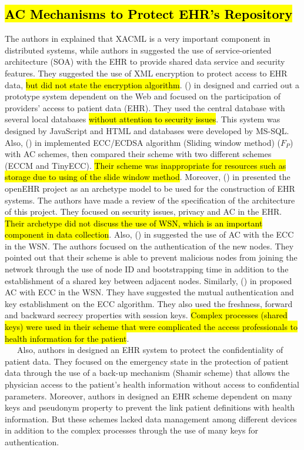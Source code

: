 \documentclass[a4paper,11pt]{article}
\DeclareRobustCommand{\hlyellow}[1]{{\sethlcolor{white}\hl{#1}}}
\begin{document}
\subsection{\hlyellow{AC Mechanisms to Protect EHR's Repository}}
The authors in \cite{pr42} explained that XACML is a very important component in distributed systems, while authors in \cite{pr52} suggested the use of service-oriented architecture (SOA) with the EHR to provide shared data service and security features. They suggested the use of XML encryption to protect access to EHR data, \hlyellow{but did not state the encryption algorithm}. \citeauthor{pr56}(\citeyear{pr56}) in \cite{pr56} designed and carried out a prototype system dependent on the Web and focused on the participation of providers' access to patient data (EHR). They used the central database with several local databases \hlyellow{without attention to security issues}. This system was designed by JavaScript and HTML and databases were developed by MS-SQL. Also, \citeauthor{p19}(\citeyear{p19}) in \cite{p19} implemented ECC/ECDSA algorithm (Sliding window method) ($F_P$) with AC schemes, then compared their scheme with two different schemes (ECCM and TinyECC). \hlyellow{Their scheme was inappropriate for resources such as storage due to using of the slide window method}. Moreover, \citeauthor{pr47}(\citeyear{pr47}) in \cite{pr47} presented the openEHR project as an archetype model to be used for the construction of EHR systems. The authors have made a review of the specification of the architecture of this project. They focused on security issues, privacy and AC in the EHR. \hlyellow{Their archetype did not discuss the use of WSN, which is an important component in data collection}. Also, \citeauthor{pr25}(\citeyear{pr25}) in \cite{pr25} suggested the use of AC with the ECC in the WSN. The authors focused on the authentication of the new nodes. They pointed out that their scheme is able to prevent malicious nodes from joining the network through the use of node ID and bootstrapping time in addition to the establishment of a shared key between adjacent nodes. Similarly, \citeauthor{pr24}(\citeyear{pr24}) in \cite{pr24} proposed AC with ECC in the WSN. They have suggested the mutual authentication and key establishment on the ECC algorithm. They also used the freshness, forward and backward secrecy properties with session keys. \hlyellow{Complex processes (shared keys) were used in their scheme that were complicated the access professionals to health information for the patient}.\\
~~~Also, authors in \cite{pr46} designed an EHR system to protect the confidentiality of patient data. They focused on the emergency state in the protection of patient data through the use of a back-up mechanism (Shamir scheme) that allows the physician access to the patient's health information without access to confidential parameters. Moreover, authors in \cite{pr49, pr54} designed an EHR scheme dependent on many keys and pseudonym property to prevent the link patient definitions with health information. But these schemes \cite{pr46,pr49,pr54} lacked data management among different devices in addition to the complex processes through the use of many keys for authentication.\\
\end{document}
